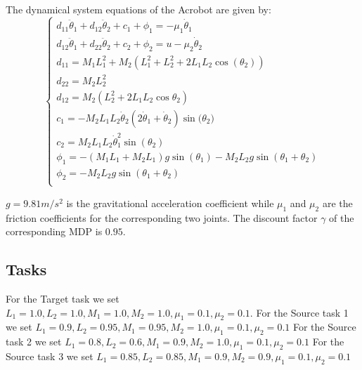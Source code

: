     \noindent The dynamical system equations of the Acrobot are given by:
    \begin{equation}
      \begin{cases}
        d_{11}\ddot{\theta}_1 + d_{12}\ddot{\theta}_2 + c_1 + \phi_1 = -\mu_{1} \dot{\theta}_1 \\
        d_{12}\ddot{\theta}_1 + d_{22}\ddot{\theta}_2 + c_2 + \phi_2 = u - \mu_{2} \dot{\theta}_2 \\
        d_{11} = M_{1}L_{1}^{2} + M_{2}(L_{1}^{2} + L_{2}^{2}  + 2L_{1}L_{2}\cos(\theta_2)) \\
        d_{22} = M_{2}L_{2}^{2} \\
        d_{12} = M_{2}(L_{2}^{2} + 2L_{1}L_{2}\cos{\theta_2}) \\
        c_{1} = -M_{2}L_{1}L_{2}\dot{\theta}_{2}(2\dot{\theta}_{1} + \dot{\theta}_{2})\sin({\theta_2)} \\
        c_{2} = M_{2}L_{1}L_{2}\dot{\theta}_{1}^{2}\sin(\theta_{2}) \\
        \phi_{1} = -(M_{1}L_{1} + M_{2}L_{1}) g \sin(\theta_1) - M_{2}L_{2} g \sin(\theta_1 + \theta_2) \\
        \phi_{2} = -M_{2}L_{2} g \sin(\theta_1 + \theta_2) \\
      \end{cases}
    \end{equation}

    \noindent $g = 9.81 m/s^{2}$ is the gravitational acceleration coefficient while $\mu_1$ and $\mu_2$ are the
    friction coefficients for the corresponding two joints.\newline
    The discount factor $\gamma$ of the corresponding MDP is $0.95$.

    \subsection{Tasks}
      \noindent For the Target task we set $L_1 = 1.0, L_2 = 1.0, M_1 = 1.0, M_2 = 1.0, \mu_1 = 0.1, \mu_2 = 0.1$.\newline
      For the Source task 1 we set $L_1 = 0.9, L_2 = 0.95, M_1 = 0.95, M_2 = 1.0, \mu_1 = 0.1, \mu_2 = 0.1$\newline
      For the Source task 2 we set $L_1 = 0.8, L_2 = 0.6, M_1 = 0.9, M_2 = 1.0, \mu_1 = 0.1, \mu_2 = 0.1$\newline
      For the Source task 3 we set $L_1 = 0.85, L_2 = 0.85, M_1 = 0.9, M_2 = 0.9, \mu_1 = 0.1, \mu_2 = 0.1$\newline


